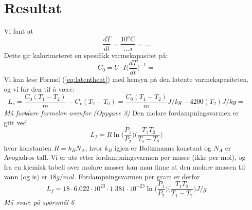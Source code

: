 \documentclass[norsk,a4paper,12pt]{article}
\begin{document}
\section{Resultat}
Vi fant at 
\begin{equation}
\frac{dT}{dt}=\frac{10^oC}{...s}=...
\end{equation}
Dette gir kalorimeteret en spesifikk varmekapasitet på:
\begin{equation}
C_0=U\cdot I\bigg(\frac{dT}{dt}\bigg)^{-1}=
\end{equation}
Vi kan løse Formel (\ref{eq:latentheat}) med hensyn på den latente varmekapasiteten, og vi får den til å være:
\begin{equation}
L_s=\frac{C_0(T_1 - T_2)}{m}-C_v(T_2 - T_0)=\frac{C_0(T_1 - T_2)}{m}J/kg-4200(T_2)J/kg=
\end{equation}
\emph{\color{red} Må forklare formelen ovenfor (Oppgave 3)}\newline
Den molare fordampningsvarmen er gitt ved
\begin{equation}
L_f=R\ln\bigg(\frac{P_1}{P_2}\bigg)\bigg(\frac{T_1T_2}{T_1-T_2}\bigg)
\end{equation}
hvor konstanten $R=k_BN_A$, hvor $k_B$ igjen er Boltzmanns konstant og $N_A$ er Avogadros tall. Vi er ute etter fordampningsvarmen per masse (ikke per mol), og fra en kjemisk tabell over molare masser kan man finne at den molare massen til vann (og is) er $18 g/mol$. Fordampningsvarmen per gram er derfor
\begin{equation}
L_f=18\cdot6.022\cdot10^{23}\cdot1.381\cdot10^{-23}\ln\bigg(\frac{P_1}{P_2}\bigg)\bigg(\frac{T_1T_2}{T_1-T_2}\bigg)J/g
\end{equation}
\emph{\color{red} Må svare på spørsmål 6}
\end{document}
